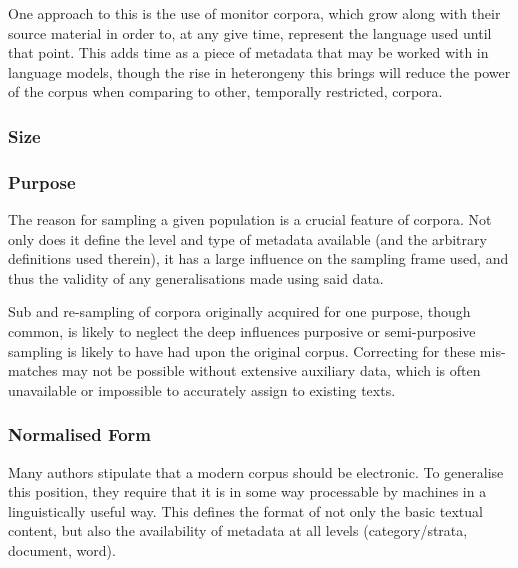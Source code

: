 One approach to this is the use of monitor corpora, which grow along with their source material in order to, at any give time, represent the language used until that point.  This adds time as a piece of metadata that may be worked with in language models, though the rise in heterongeny this brings will reduce the power of the corpus when comparing to other, temporally restricted, corpora. 




\subsubsection{Size}


\subsubsection{Purpose}
The reason for sampling a given population is a crucial feature of corpora.  Not only does it define the level and type of metadata available (and the arbitrary definitions used therein), it has a large influence on the sampling frame used, and thus the validity of any generalisations made using said data.


Sub and re-sampling of corpora originally acquired for one purpose, though common, is likely to neglect the deep influences purposive or semi-purposive sampling is likely to have had upon the original corpus.  Correcting for these mis-matches may not be possible without extensive auxiliary data, which is often unavailable or impossible to accurately assign to existing texts.



\subsubsection{Normalised Form}
Many authors stipulate that a modern corpus should be electronic.  To generalise this position, they require that it is in some way processable by machines in a linguistically useful way.  This defines the format of not only the basic textual content, but also the availability of metadata at all levels (category/strata, document, word).

